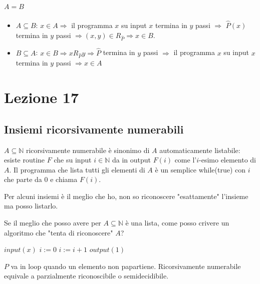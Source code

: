 \documentclass{article}
\begin{document}
\paragraph{$A=B$}
\begin{itemize}
	\item $A\subseteq B$: $x \in A \Rightarrow$ il programma $x$ su input $x$ termina in $y$ passi $\Rightarrow$ $\hat{P}(x)$ termina in $y$ passi $\Rightarrow (x,y) \in R_{\hat{P}} \Rightarrow x \in B$.
	\item $B \subseteq A$: $x \in B \Rightarrow x R_{\hat{P}} y \Rightarrow \hat{P}$ termina in $y$ passi $\Rightarrow$ il programma $x$ su input $x$ termina in $y$ passi $\Rightarrow x \in A$ 
\end{itemize}

\section{Lezione 17}
\subsection{Insiemi ricorsivamente numerabili}
$A \subseteq \mathbb{N}$ ricorsivamente numerabile è sinonimo di $A$ automaticamente listabile: esiste routine $F$ che su input $i \in \mathbb{N}$ da in output $F(i)$ come l'$i$-esimo elemento di $A$.
Il programma che lista tutti gli elementi di $A$ è un semplice while(true) con $i$ che parte da 0 e chiama $F(i)$. 




Per alcuni insiemi è il meglio che ho, non so riconoscere "esattamente" l'insieme ma posso listarlo.







Se il meglio che posso avere per $A \subseteq \mathbb{N}$ è una lista, come posso crivere un algoritmo che "tenta di riconoscere" $A$?

\begin{algorithm}[h]
	\caption{$P\equiv$}
	\label{parzric}
        \begin{algorithmic}[1]
        		 \State $input(x)$
        		 \State $i:=0$
        		 	\State $i:= i+1$
        		 \EndWhile
        		 \State $output(1)$
        		  
        \end{algorithmic}
    \end{algorithm}
    
$P$ va in loop quando un elemento non papartiene. Ricorsivamente numerabile equivale a parzialmente riconoscibile o semidecidibile.
\end{document}

